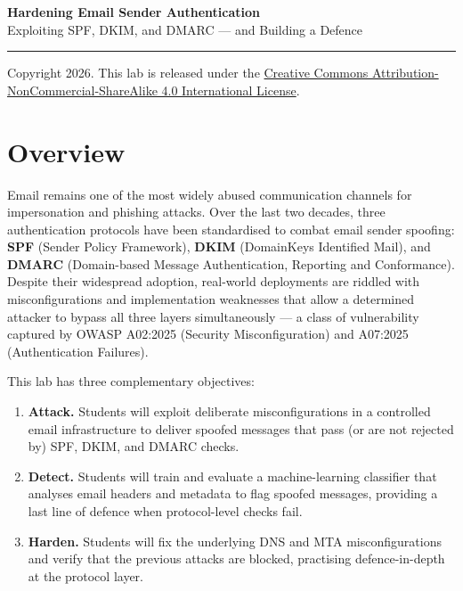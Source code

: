 \documentclass[11pt]{article}
\begin{document}

\begin{center}
  {\LARGE\bfseries Hardening Email Sender Authentication}\\[6pt]
  {\large Exploiting SPF, DKIM, and DMARC --- and Building a Defence}
\end{center}

\vspace{4pt}
\noindent\rule{\linewidth}{0.6pt}
\vspace{4pt}

\noindent
Copyright \textcopyright{} 2026.
This lab is released under the
\href{http://creativecommons.org/licenses/by-nc-sa/4.0/}{Creative
Commons Attribution-NonCommercial-ShareAlike 4.0 International License}.

\vspace{8pt}

{\small\tableofcontents}

\vspace{8pt}

\section{Overview}

Email remains one of the most widely abused communication channels for
impersonation and phishing attacks.
Over the last two decades, three authentication protocols have been
standardised to combat email sender spoofing:
\textbf{SPF} (Sender Policy Framework),
\textbf{DKIM} (DomainKeys Identified Mail), and
\textbf{DMARC} (Domain-based Message Authentication, Reporting and
Conformance).
Despite their widespread adoption, real-world deployments are riddled
with misconfigurations and implementation weaknesses that allow a
determined attacker to bypass all three layers simultaneously --- a class
of vulnerability captured by OWASP A02:2025 (Security Misconfiguration)
and A07:2025 (Authentication Failures).

This lab has three complementary objectives:

\begin{enumerate}[noitemsep]
  \item \textbf{Attack.} Students will exploit deliberate
    misconfigurations in a controlled email infrastructure to deliver
    spoofed messages that pass (or are not rejected by) SPF, DKIM, and
    DMARC checks.
  \item \textbf{Detect.} Students will train and evaluate a
    machine-learning classifier that analyses email headers and metadata
    to flag spoofed messages, providing a last line of defence when
    protocol-level checks fail.
  \item \textbf{Harden.} Students will fix the underlying DNS and MTA
    misconfigurations and verify that the previous attacks are blocked,
    practising defence-in-depth at the protocol layer.
\end{enumerate}
\end{document}
